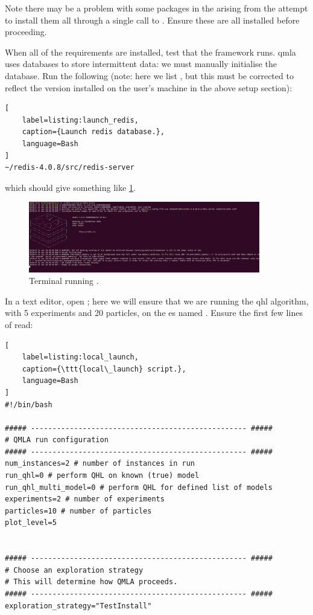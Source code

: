 Note there may be a problem with some packages in the  arising from the attempt to install them all through
a single call to . 
Ensure these are all installed before proceeding. 
\par 

When all of the requirements are installed, test that the framework runs. 
\gls{qmla} uses  databases to store intermittent data:
    we must manually initialise the database. 
Run the following 
    (note: here we list , but this must be corrected to reflect the 
    version installed on the user's machine in the above setup section):
\begin{lstlisting}[
    label=listing:launch_redis,
    caption={Launch redis database.},
    language=Bash
]
~/redis-4.0.8/src/redis-server
\end{lstlisting}

which should give something like \cref{fig:terminal_redis}.
\begin{figure}[h!]
    \begin{center}
        \includegraphics[width=0.9\textwidth]{appendix/figures/terminal_redis.png}
    \end{center}
    \caption[Terminal running redis-server]{Terminal running .}
    \label{fig:terminal_redis}
\end{figure}
\par 

In a text editor, open ; 
    here we will ensure that we are running the \gls{qhl} algorithm, 
    with 5 experiments and 20 particles, on the \gls{es} named .
Ensure the first few lines of  read:

\begin{lstlisting}[
    label=listing:local_launch,
    caption={\ttt{local\_launch} script.},
    language=Bash
]
#!/bin/bash

##### -------------------------------------------------- #####
# QMLA run configuration
##### -------------------------------------------------- #####
num_instances=2 # number of instances in run
run_qhl=0 # perform QHL on known (true) model
run_qhl_multi_model=0 # perform QHL for defined list of models
experiments=2 # number of experiments
particles=10 # number of particles
plot_level=5


##### -------------------------------------------------- #####
# Choose an exploration strategy 
# This will determine how QMLA proceeds. 
##### -------------------------------------------------- #####
exploration_strategy="TestInstall"
\end{lstlisting}    


